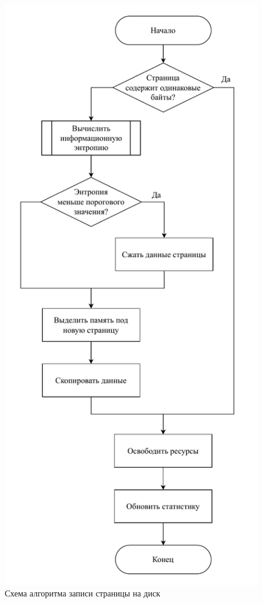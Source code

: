 \begin{figure}[H]
	\begin{center}
		\includegraphics[scale=0.7]{inc/img/write-page.pdf}
	\end{center}
	\captionsetup{justification=centering}
	\caption{Схема алгоритма записи страницы на диск}
	\label{img:write-page}
\end{figure}

